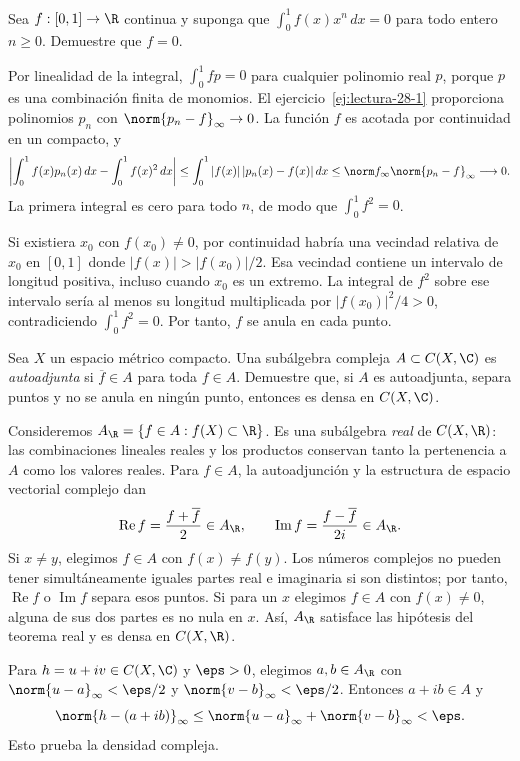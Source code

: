\begin{ejercicio}\label{ej:lectura-28-2}
Sea $f:[0,1]\to\R$ continua y suponga que $\int_0^1 f(x)x^n\,dx=0$ para todo entero $n\ge0$. Demuestre que $f=0$.
\end{ejercicio}
\begin{solucion}
Por linealidad de la integral, $\int_0^1fp=0$ para cualquier polinomio real $p$, porque $p$ es una combinación finita de monomios. El ejercicio~\ref{ej:lectura-28-1} proporciona polinomios $p_n$ con $\norm{p_n-f}_\infty\to0$. La función $f$ es acotada por continuidad en un compacto, y
\[
 \left|\int_0^1f(x)p_n(x)\,dx-\int_0^1f(x)^2\,dx\right|
 \le\int_0^1|f(x)|\,|p_n(x)-f(x)|\,dx
 \le\norm f_\infty\norm{p_n-f}_\infty\longrightarrow0.
\]
La primera integral es cero para todo $n$, de modo que $\int_0^1f^2=0$.

Si existiera $x_0$ con $f(x_0)\ne0$, por continuidad habría una vecindad relativa de $x_0$ en $[0,1]$ donde $|f(x)|>|f(x_0)|/2$. Esa vecindad contiene un intervalo de longitud positiva, incluso cuando $x_0$ es un extremo. La integral de $f^2$ sobre ese intervalo sería al menos su longitud multiplicada por $|f(x_0)|^2/4>0$, contradiciendo $\int_0^1f^2=0$. Por tanto, $f$ se anula en cada punto.
\end{solucion}

\begin{ejercicio}\label{ej:lectura-28-3}
Sea $X$ un espacio métrico compacto. Una subálgebra compleja $A\subset C(X,\C)$ es \emph{autoadjunta} si $\overline f\in A$ para toda $f\in A$. Demuestre que, si $A$ es autoadjunta, separa puntos y no se anula en ningún punto, entonces es densa en $C(X,\C)$.
\end{ejercicio}
\begin{solucion}
Consideremos $A_\R=\{f\in A:f(X)\subset\R\}$. Es una subálgebra \emph{real} de $C(X,\R)$: las combinaciones lineales reales y los productos conservan tanto la pertenencia a $A$ como los valores reales. Para $f\in A$, la autoadjunción y la estructura de espacio vectorial complejo dan
\[
 \operatorname{Re}f=\frac{f+\overline f}{2}\in A_\R,
 \qquad\operatorname{Im}f=\frac{f-\overline f}{2i}\in A_\R.
\]
Si $x\ne y$, elegimos $f\in A$ con $f(x)\ne f(y)$. Los números complejos no pueden tener simultáneamente iguales partes real e imaginaria si son distintos; por tanto, $\operatorname{Re}f$ o $\operatorname{Im}f$ separa esos puntos. Si para un $x$ elegimos $f\in A$ con $f(x)\ne0$, alguna de sus dos partes es no nula en $x$. Así, $A_\R$ satisface las hipótesis del teorema real y es densa en $C(X,\R)$.

Para $h=u+iv\in C(X,\C)$ y $\eps>0$, elegimos $a,b\in A_\R$ con $\norm{u-a}_\infty<\eps/2$ y $\norm{v-b}_\infty<\eps/2$. Entonces $a+ib\in A$ y
\[
 \norm{h-(a+ib)}_\infty\le\norm{u-a}_\infty+\norm{v-b}_\infty<\eps.
\]
Esto prueba la densidad compleja.
\end{solucion}

